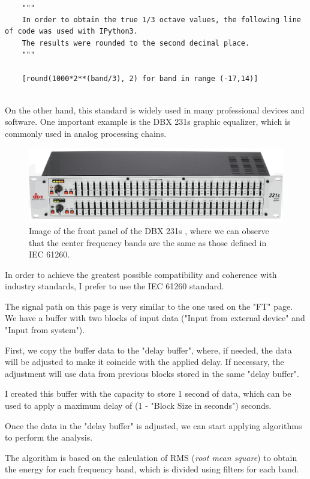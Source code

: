 \begin{verbatim}
	"""
	In order to obtain the true 1/3 octave values, the following line of code was used with IPython3.
	The results were rounded to the second decimal place.
	"""
	
	[round(1000*2**(band/3), 2) for band in range (-17,14)]
	
\end{verbatim}

On the other hand, this standard is widely used in many professional devices and software. One important example is the DBX 231s graphic equalizer, which is commonly used in analog processing chains.

\begin{figure}[H]
	\centering
	\includegraphics[width=1
	\linewidth]{Figures/DBX_231s.png}
	\caption{Image of the front panel of the DBX 231s \cite{DBX_31s}, where we can observe that the center frequency bands are the same as those defined in IEC 61260.}
	\label{fig:DBX_31s}
\end{figure}

In order to achieve the greatest possible compatibility and coherence with industry standards, I prefer to use the IEC 61260 standard.


The signal path on this page is very similar to the one used on the "FT" page. We have a buffer with two blocks of input data ("Input from external device" and "Input from system").

First, we copy the buffer data to the "delay buffer", where, if needed, the data will be adjusted to make it coincide with the applied delay. If necessary, the adjustment will use data from previous blocks stored in the same "delay buffer".

I created this buffer with the capacity to store 1 second of data, which can be used to apply a maximum delay of (1 - "Block Size in seconds") seconds.

Once the data in the "delay buffer" is adjusted, we can start applying algorithms to perform the analysis.

The algorithm is based on the calculation of RMS (\textit{root mean square}) to obtain the energy for each frequency band, which is divided using filters for each band.



